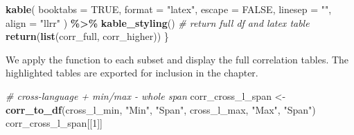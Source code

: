 \documentclass[
]{article}
\newenvironment{Shaded}{\begin{snugshade}}{\end{snugshade}}
\newcommand{\AttributeTok}[1]{\textcolor[rgb]{0.13,0.29,0.53}{#1}}
\newcommand{\CommentTok}[1]{\textcolor[rgb]{0.56,0.35,0.01}{\textit{#1}}}
\newcommand{\ConstantTok}[1]{\textcolor[rgb]{0.56,0.35,0.01}{#1}}
\newcommand{\DecValTok}[1]{\textcolor[rgb]{0.00,0.00,0.81}{#1}}
\newcommand{\FunctionTok}[1]{\textcolor[rgb]{0.13,0.29,0.53}{\textbf{#1}}}
\newcommand{\NormalTok}[1]{#1}
\newcommand{\OtherTok}[1]{\textcolor[rgb]{0.56,0.35,0.01}{#1}}
\newcommand{\SpecialCharTok}[1]{\textcolor[rgb]{0.81,0.36,0.00}{\textbf{#1}}}
\newcommand{\StringTok}[1]{\textcolor[rgb]{0.31,0.60,0.02}{#1}}
\begin{document}
\begin{Shaded}
\begin{Highlighting}[]
    \FunctionTok{kable}\NormalTok{(}
      \AttributeTok{booktabs =} \ConstantTok{TRUE}\NormalTok{, }\AttributeTok{format =} \StringTok{"latex"}\NormalTok{, }\AttributeTok{escape =} \ConstantTok{FALSE}\NormalTok{, }\AttributeTok{linesep =} \StringTok{""}\NormalTok{,}
      \AttributeTok{align =} \StringTok{"llrr"}
\NormalTok{    ) }\SpecialCharTok{\%\textgreater{}\%}
    \FunctionTok{kable\_styling}\NormalTok{()}
  \CommentTok{\# return full df and latex table}
  \FunctionTok{return}\NormalTok{(}\FunctionTok{list}\NormalTok{(corr\_full, corr\_higher))}
\NormalTok{\}}
\end{Highlighting}
\end{Shaded}

We apply the function to each subset and display the full correlation
tables. The highlighted tables are exported for inclusion in the
chapter.

\begin{Shaded}
\begin{Highlighting}[]
\CommentTok{\# cross{-}language + min/max {-} whole span}
\NormalTok{corr\_cross\_l\_span }\OtherTok{\textless{}{-}} \FunctionTok{corr\_to\_df}\NormalTok{(cross\_l\_min, }\StringTok{"Min"}\NormalTok{, }\StringTok{"Span"}\NormalTok{, cross\_l\_max, }\StringTok{"Max"}\NormalTok{, }\StringTok{"Span"}\NormalTok{)}
\NormalTok{corr\_cross\_l\_span[[}\DecValTok{1}\NormalTok{]]}
\end{Highlighting}
\end{Shaded}
\end{document}
